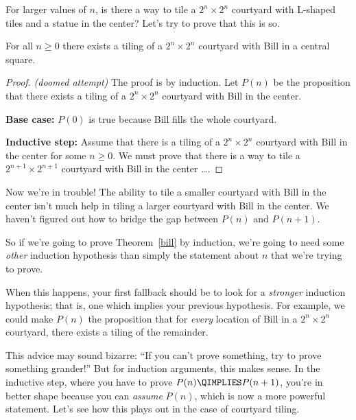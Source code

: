 For larger values of $n$, is there a way to tile a $2^n \times 2^n$
courtyard with L-shaped tiles and a statue in the center?  Let's try to
prove that this is so.

\begin{theorem}\label{bill}
For all $n \geq 0$ there exists a tiling of a $2^n \times 2^n$
courtyard with Bill in a central square.
\end{theorem}

\begin{proof}
{\em (doomed attempt)} The proof is by induction.  Let $P(n)$ be the
proposition that there exists a tiling of a $2^n \times 2^n$ courtyard
with Bill in the center.

\textbf{Base case:} $P(0)$ is true because Bill fills the whole courtyard.

\textbf{Inductive step:} Assume that there is a tiling of a
$2^n \times 2^n$ courtyard with Bill in the center for some $n \geq
0$.  We must prove that there is a way to tile a $2^{n+1} \times
2^{n+1}$ courtyard with Bill in the center \dots.
\end{proof}

Now we're in trouble!  The ability to tile a smaller courtyard with Bill
in the center isn't much help in tiling a larger courtyard with Bill in
the center.  We haven't figured out how to bridge the gap between $P(n)$
and $P(n+1)$.

So if we're going to prove Theorem~\ref{bill} by induction, we're going to
need some \emph{other} induction hypothesis than simply the statement
about $n$ that we're trying to prove.





When this happens, your first fallback should be to look for a
\emph{stronger} induction hypothesis; that is, one which implies
your previous hypothesis.  For example, we could make $P(n)$ the
proposition that for \emph{every} location of Bill in a $2^n \times
2^n$ courtyard, there exists a tiling of the remainder.

This advice may sound bizarre: ``If you can't prove something, try to
prove something grander!''  But for induction arguments, this makes sense.
In the inductive step, where you have to prove $P(n) \QIMPLIES P(n+1)$,
you're in better shape because you can {\em assume} $P(n)$, which is now a
more powerful statement.  Let's see how this plays out in the case of
courtyard tiling.

